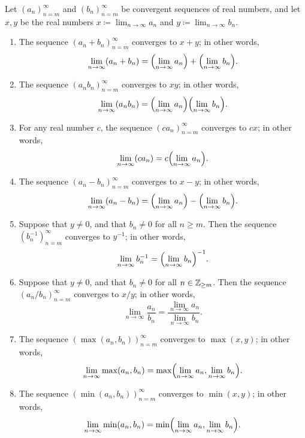 \setcounter{thm}{18}
\begin{thm}\label{i:6.1.19}
  Let \((a_n)_{n = m}^\infty\) and \((b_n)_{n = m}^\infty\) be convergent sequences of real numbers, and let \(x, y\) be the real numbers \(x \coloneqq \lim_{n \to \infty} a_n\) and \(y \coloneqq \lim_{n \to \infty} b_n\).
  \begin{enumerate}
    \item The sequence \((a_n + b_n)_{n = m}^\infty\) converges to \(x + y\);
          in other words,
          \[
            \lim_{n \to \infty} (a_n + b_n) = \pa{\lim_{n \to \infty} a_n} + \pa{\lim_{n \to \infty} b_n}.
          \]
    \item The sequence \((a_n b_n)_{n = m}^\infty\) converges to \(xy\);
          in other words,
          \[
            \lim_{n \to \infty} (a_n b_n) = \pa{\lim_{n \to \infty} a_n} \pa{\lim_{n \to \infty} b_n}.
          \]
    \item For any real number \(c\), the sequence \((c a_n)_{n = m}^\infty\) converges to \(cx\);
          in other words,
          \[
            \lim_{n \to \infty} (c a_n) = c \pa{\lim_{n \to \infty} a_n}.
          \]
    \item The sequence \((a_n - b_n)_{n = m}^\infty\) converges to \(x - y\);
          in other words,
          \[
            \lim_{n \to \infty} (a_n - b_n) = \pa{\lim_{n \to \infty} a_n} - \pa{\lim_{n \to \infty} b_n}.
          \]
    \item Suppose that \(y \neq 0\), and that \(b_n \neq 0\) for all \(n \geq m\).
          Then the sequence \((b_n^{-1})_{n = m}^\infty\) converges to \(y^{-1}\);
          in other words,
          \[
            \lim_{n \to \infty} b_n^{-1} = \pa{\lim_{n \to \infty} b_n}^{-1}.
          \]
    \item Suppose that \(y \neq 0\), and that \(b_n \neq 0\) for all \(n \in \mathbb{Z}_{\geq m}\).
          Then the sequence \((a_n / b_n)_{n = m}^\infty\) converges to \(x / y\);
          in other words,
          \[
            \lim_{n \to \infty} \dfrac{a_n}{b_n} = \dfrac{\lim_{n \to \infty} a_n}{\lim_{n \to \infty} b_n}.
          \]
    \item The sequence \((\max(a_n, b_n))_{n = m}^\infty\) converges to \(\max(x, y)\);
          in other words,
          \[
            \lim_{n \to \infty} \max(a_n, b_n) = \max\pa{\lim_{n \to \infty} a_n, \lim_{n \to \infty} b_n}.
          \]
    \item The sequence \((\min(a_n, b_n))_{n = m}^\infty\) converges to \(\min(x, y)\);
          in other words,
          \[
            \lim_{n \to \infty} \min(a_n, b_n) = \min\pa{\lim_{n \to \infty} a_n, \lim_{n \to \infty} b_n}.
          \]
  \end{enumerate}
\end{thm}

